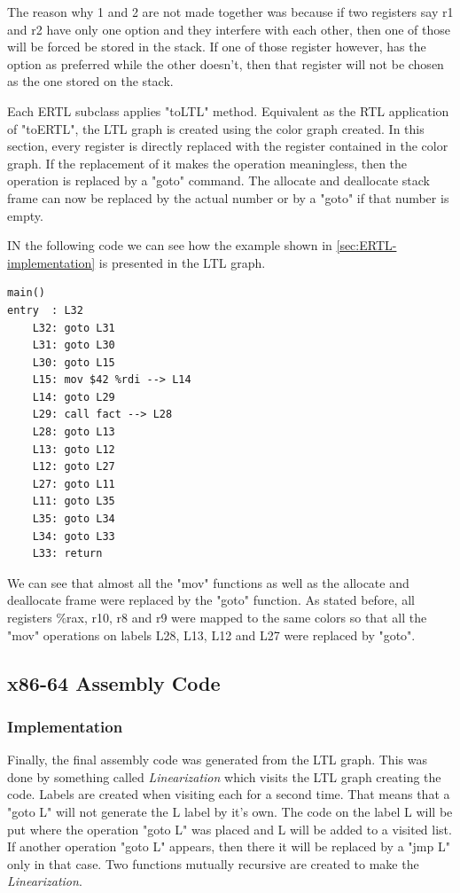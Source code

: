 \documentclass[conference]{IEEEtran}
\theoremstyle{definition}
\begin{document}
The reason why 1 and 2 are not made together was because if two registers say r1 and r2 have only one option and they interfere with each other, then one of those will be forced be stored in the stack. If one of those register however, has the option as preferred while the other doesn't, then that register will not be chosen as the one stored on the stack.

Each ERTL subclass applies "toLTL" method. Equivalent as the RTL application of "toERTL", the LTL graph is created using the color graph created. In this section, every register is directly replaced with the register contained in the color graph. If the replacement of it makes the operation meaningless, then the operation is replaced by a "goto" command. The allocate and deallocate stack frame can now be replaced by the actual number or by a "goto" if that number is empty.

IN the following code we can see how the example shown in \ref{sec:ERTL-implementation} is presented in the LTL graph.

\begin{lstlisting}
main()
entry  : L32
	L32: goto L31
	L31: goto L30
	L30: goto L15
	L15: mov $42 %rdi --> L14
	L14: goto L29
	L29: call fact --> L28
	L28: goto L13
	L13: goto L12
	L12: goto L27
	L27: goto L11
	L11: goto L35
	L35: goto L34
	L34: goto L33
	L33: return
\end{lstlisting}

We can see that almost all the "mov" functions as well as the allocate and deallocate frame were replaced by the "goto" function.
As stated before, all registers \%rax, r10, r8 and r9 were mapped to the same colors so that all the "mov" operations on labels L28, L13, L12 and L27 were replaced by "goto".

\subsection{x86-64 Assembly Code}
\subsubsection{Implementation}
Finally, the final assembly code was generated from the LTL graph. This was done by something called \textit{Linearization} which visits the LTL graph creating the code.
Labels are created when visiting each for a second time. That means that a "goto L" will not generate the L label by it's own. The code on the label L will be put where the operation "goto L" was placed and L will be added to a visited list. If another operation "goto L" appears, then there it will be replaced by a "jmp L" only in that case.
Two functions mutually recursive are created to make the \textit{Linearization}.
\end{document}

